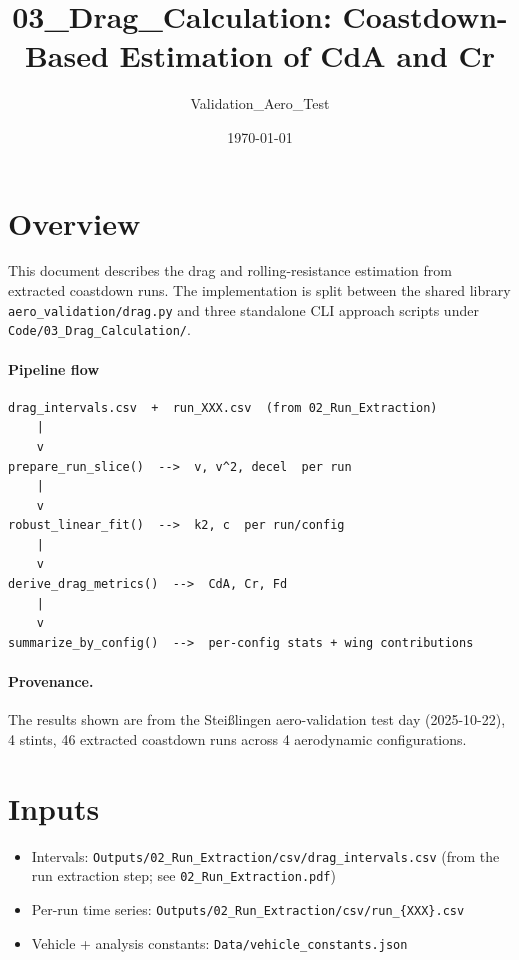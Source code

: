 \documentclass[11pt,a4paper]{article}
\title{03\_Drag\_Calculation: Coastdown-Based Estimation of CdA and Cr}
\author{Validation\_Aero\_Test}
\date{\today}
\begin{document}
\maketitle

\section{Overview}
This document describes the drag and rolling-resistance estimation from
extracted coastdown runs.  The implementation is split between the shared
library \texttt{aero\_validation/drag.py} and three standalone CLI approach
scripts under \texttt{Code/03\_Drag\_Calculation/}.

\paragraph{Pipeline flow}
\begin{center}
\begin{verbatim}
drag_intervals.csv  +  run_XXX.csv  (from 02_Run_Extraction)
    |
    v
prepare_run_slice()  -->  v, v^2, decel  per run
    |
    v
robust_linear_fit()  -->  k2, c  per run/config
    |
    v
derive_drag_metrics()  -->  CdA, Cr, Fd
    |
    v
summarize_by_config()  -->  per-config stats + wing contributions
\end{verbatim}
\end{center}

\paragraph{Provenance.}
The results shown are from the Stei\ss{}lingen aero-validation test day
(2025-10-22), 4 stints, 46 extracted coastdown runs across 4 aerodynamic
configurations.

\section{Inputs}
\begin{itemize}
  \item Intervals: \texttt{Outputs/02\_Run\_Extraction/csv/drag\_intervals.csv}
        (from the run extraction step; see \texttt{02\_Run\_Extraction.pdf})
  \item Per-run time series: \texttt{Outputs/02\_Run\_Extraction/csv/run\_\{XXX\}.csv}
  \item Vehicle + analysis constants: \texttt{Data/vehicle\_constants.json}
\end{itemize}
\end{document}

